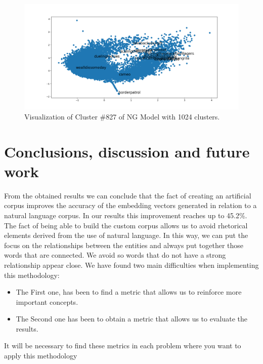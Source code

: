 \documentclass[letterpaper]{article}
\begin{document}
	
	\begin{figure}
	\centering
	\includegraphics[width=1\linewidth]{../images/cluster-ng-1024-c827-zoom-out.png}
	\caption{Visualization of Cluster \#827 of NG Model with 1024 clusters.}
	\label{fig:cluster-ng-827-visualization-zoom-out}
	\end{figure}
	
	
	
	\section{Conclusions, discussion and future work}
	
	From the obtained results we can conclude that the fact of creating an artificial corpus improves the accuracy of the embedding vectors generated in relation to a natural language corpus. In our results this improvement reaches up to 45.2\%. The fact of being able to build the custom corpus allows us to avoid rhetorical elements derived from the use of natural language. In this way, we can put the focus on the relationships between the entities and always put together those words that are connected. We avoid so words that do not have a strong relationship appear close. 
	We have found two main difficulties when implementing this methodology:
	\begin{itemize}
	\item The First one, has been to find a metric that allows us to reinforce more important concepts. 
	\item The Second one has been to obtain a metric that allows us to evaluate the results.
	\end{itemize}
	It will be necessary to find these metrics in each problem where you want to apply this methodology
	
\end{document}

